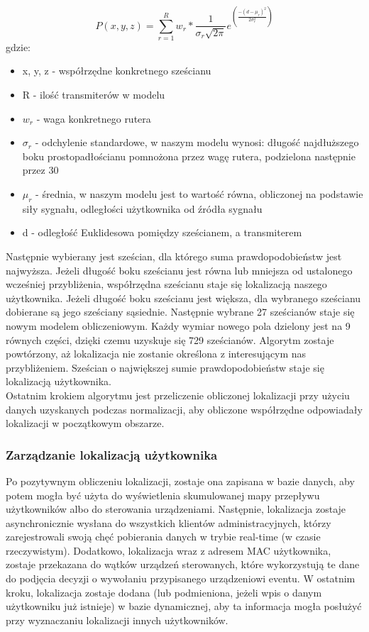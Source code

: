 \begin{equation}
P(x,y,z) = \sum_{r=1}^{R} w_r * \frac{1}{\sigma_r\sqrt{2\pi}}e^{\left(\frac{-(d-\mu_r)^2}{2\sigma_r^2}\right)}
\end{equation}
gdzie:
\begin{itemize}
	\item x, y, z - współrzędne konkretnego sześcianu
	\item R - ilość transmiterów w modelu
	\item $w_r$ - waga konkretnego rutera
	\item $\sigma_r$ - odchylenie standardowe, w naszym modelu wynosi: długość najdłuższego boku prostopadłościanu pomnożona przez wagę rutera, podzielona następnie przez 30
	\item $\mu_r$ - średnia, w naszym modelu jest to wartość równa, obliczonej na podstawie siły sygnału, odległości użytkownika od źródła sygnału
	\item d - odległość Euklidesowa pomiędzy sześcianem, a transmiterem
\end{itemize}
Następnie wybierany jest sześcian, dla którego suma prawdopodobieństw jest najwyższa. Jeżeli długość boku sześcianu jest równa lub mniejsza od ustalonego wcześniej przybliżenia, współrzędna sześcianu staje się lokalizacją naszego użytkownika. Jeżeli długość boku sześcianu jest większa, dla wybranego sześcianu dobierane są jego sześciany sąsiednie. Następnie wybrane 27 sześcianów staje się nowym modelem obliczeniowym. Każdy wymiar nowego pola dzielony jest na 9 równych części, dzięki czemu uzyskuje się 729 sześcianów. Algorytm zostaje powtórzony, aż lokalizacja nie zostanie określona z interesującym nas przybliżeniem. Sześcian o największej sumie prawdopodobieństw staje się lokalizacją użytkownika.\\
Ostatnim krokiem algorytmu jest przeliczenie obliczonej lokalizacji przy użyciu danych uzyskanych podczas normalizacji, aby obliczone współrzędne odpowiadały lokalizacji w początkowym obszarze.
\subsubsection{Zarządzanie lokalizacją użytkownika}
Po pozytywnym obliczeniu lokalizacji, zostaje ona zapisana w bazie danych, aby potem mogła być użyta do wyświetlenia skumulowanej mapy przepływu użytkowników albo do sterowania urządzeniami. Następnie, lokalizacja zostaje asynchronicznie wysłana do wszystkich klientów administracyjnych, którzy zarejestrowali swoją chęć pobierania danych w trybie real-time (w czasie rzeczywistym). Dodatkowo, lokalizacja wraz z adresem MAC użytkownika, zostaje przekazana do wątków urządzeń sterowanych, które wykorzystują te dane do podjęcia decyzji o wywołaniu przypisanego urządzeniowi eventu. W ostatnim kroku, lokalizacja zostaje dodana (lub podmieniona, jeżeli wpis o danym użytkowniku już istnieje) w bazie dynamicznej, aby ta informacja mogła posłużyć przy wyznaczaniu lokalizacji innych użytkowników.
